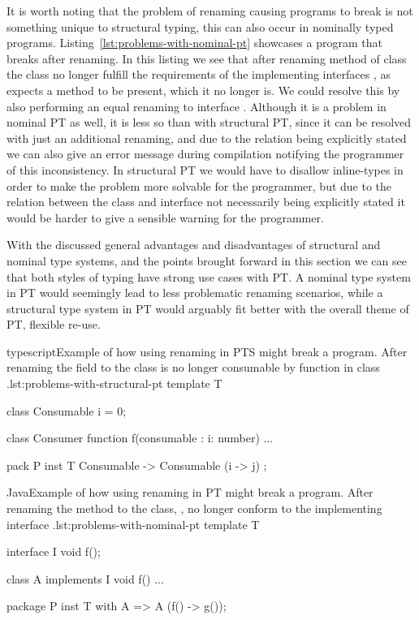 It is worth noting that the problem of renaming causing programs to break is not something unique to structural typing, this can also occur in nominally typed programs.
Listing~\vref{lst:problems-with-nominal-pt} showcases a program that breaks after renaming.
In this listing we see that after renaming method  of class  the class no longer fulfill the requirements of the implementing interfaces , as  expects a method  to be present, which it no longer is.
We could resolve this by also performing an equal renaming to interface .
Although it is a problem in nominal PT as well, it is less so than with structural PT, since it can be resolved with just an additional renaming, and due to the relation being explicitly stated we can also give an error message during compilation notifying the programmer of this inconsistency.
In structural PT we would have to disallow inline-types in order to make the problem more solvable for the programmer, but due to the relation between the class and interface not necessarily being explicitly stated it would be harder to give a sensible warning for the programmer.

With the discussed general advantages and disadvantages of structural and nominal type systems, and the points brought forward in this section we can see that both styles of typing have strong use cases with PT\@.
A nominal type system in PT would seemingly lead to less problematic renaming scenarios, while a structural type system in PT would arguably fit better with the overall theme of PT, flexible re-use.


\begin{code}{typescript}{Example of how using renaming in PTS might break a program. After renaming the field  to  the class  is no longer consumable by function  in class .}{lst:problems-with-structural-pt}
    template T {
        class Consumable {
            i = 0;
        }

        class Consumer {
            function f(consumable : {i: number}) {
                ...
            }
        }
    }

    pack P {
        inst T { Consumable -> Consumable (i -> j) };
    }
\end{code}

\begin{code}{Java}{Example of how using renaming in PT might break a program. After renaming the method  to  the class, , no longer conform to the implementing interface .}{lst:problems-with-nominal-pt}
    template T {
        interface I {
            void f();
        }

        class A implements I {
            void f() { ... }
        }
    }

    package P {
        inst T with A => A (f() -> g());
    }
\end{code}